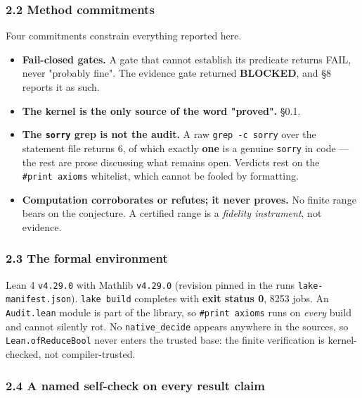 \documentclass[
  a4paper,
  11pt]{article}
\providecommand{\tightlist}{%
  \setlength{\itemsep}{0pt}\setlength{\parskip}{0pt}}
\begin{document}
\subsubsection{2.2 Method commitments}\label{22-method-commitments}

Four commitments constrain everything reported here.

\begin{itemize}
\tightlist
\item
  \textbf{Fail-closed gates.} A gate that cannot establish its predicate
  returns FAIL, never "probably fine". The evidence gate returned
  \textbf{BLOCKED}, and §8 reports it as such.
\item
  \textbf{The kernel is the only source of the word "proved".} §0.1.
\item
  \textbf{The \texttt{sorry} grep is not the audit.} A raw
  \texttt{grep\ -c\ sorry} over the statement file returns 6, of which
  exactly \textbf{one} is a genuine \texttt{sorry} in code --- the rest
  are prose discussing what remains open. Verdicts rest on the
  \texttt{\#print\ axioms} whitelist, which cannot be fooled by
  formatting.
\item
  \textbf{Computation corroborates or refutes; it never proves.} No
  finite range bears on the conjecture. A certified range is a
  \emph{fidelity instrument}, not evidence.
\end{itemize}

\subsubsection{2.3 The formal
environment}\label{23-the-formal-environment}

Lean 4 \texttt{v4.29.0} with Mathlib \texttt{v4.29.0} (revision pinned
in the run\textquotesingle s \texttt{lake-manifest.json}).
\texttt{lake\ build} completes with \textbf{exit status 0}, 8253 jobs.
An \texttt{Audit.lean} module is part of the library, so
\texttt{\#print\ axioms} runs on \emph{every} build and cannot silently
rot. No \texttt{native\_decide} appears anywhere in the sources, so
\texttt{Lean.ofReduceBool} never enters the trusted base: the finite
verification is kernel-checked, not compiler-trusted.

\subsubsection{2.4 A named self-check on every result
claim}\label{24-a-named-self-check-on-every-result-claim}
\end{document}
